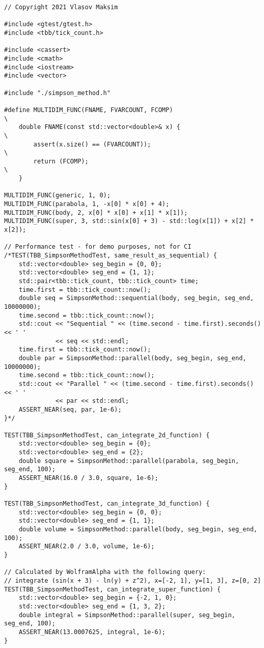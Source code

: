 \documentclass{report}
\begin{document}
\begin{lstlisting}
// Copyright 2021 Vlasov Maksim

#include <gtest/gtest.h>
#include <tbb/tick_count.h>

#include <cassert>
#include <cmath>
#include <iostream>
#include <vector>

#include "./simpson_method.h"

#define MULTIDIM_FUNC(FNAME, FVARCOUNT, FCOMP)                                 \
    double FNAME(const std::vector<double>& x) {                               \
        assert(x.size() == (FVARCOUNT));                                       \
        return (FCOMP);                                                        \
    }

MULTIDIM_FUNC(generic, 1, 0);
MULTIDIM_FUNC(parabola, 1, -x[0] * x[0] + 4);
MULTIDIM_FUNC(body, 2, x[0] * x[0] + x[1] * x[1]);
MULTIDIM_FUNC(super, 3, std::sin(x[0] + 3) - std::log(x[1]) + x[2] * x[2]);

// Performance test - for demo purposes, not for CI
/*TEST(TBB_SimpsonMethodTest, same_result_as_sequential) {
    std::vector<double> seg_begin = {0, 0};
    std::vector<double> seg_end = {1, 1};
    std::pair<tbb::tick_count, tbb::tick_count> time;
    time.first = tbb::tick_count::now();
    double seq = SimpsonMethod::sequential(body, seg_begin, seg_end, 10000000);
    time.second = tbb::tick_count::now();
    std::cout << "Sequential " << (time.second - time.first).seconds() << ' '
              << seq << std::endl;
    time.first = tbb::tick_count::now();
    double par = SimpsonMethod::parallel(body, seg_begin, seg_end, 10000000);
    time.second = tbb::tick_count::now();
    std::cout << "Parallel " << (time.second - time.first).seconds() << ' '
              << par << std::endl;
    ASSERT_NEAR(seq, par, 1e-6);
}*/

TEST(TBB_SimpsonMethodTest, can_integrate_2d_function) {
    std::vector<double> seg_begin = {0};
    std::vector<double> seg_end = {2};
    double square = SimpsonMethod::parallel(parabola, seg_begin, seg_end, 100);
    ASSERT_NEAR(16.0 / 3.0, square, 1e-6);
}

TEST(TBB_SimpsonMethodTest, can_integrate_3d_function) {
    std::vector<double> seg_begin = {0, 0};
    std::vector<double> seg_end = {1, 1};
    double volume = SimpsonMethod::parallel(body, seg_begin, seg_end, 100);
    ASSERT_NEAR(2.0 / 3.0, volume, 1e-6);
}

// Calculated by WolframAlpha with the following query:
// integrate (sin(x + 3) - ln(y) + z^2), x=[-2, 1], y=[1, 3], z=[0, 2]
TEST(TBB_SimpsonMethodTest, can_integrate_super_function) {
    std::vector<double> seg_begin = {-2, 1, 0};
    std::vector<double> seg_end = {1, 3, 2};
    double integral = SimpsonMethod::parallel(super, seg_begin, seg_end, 100);
    ASSERT_NEAR(13.0007625, integral, 1e-6);
}


\end{lstlisting}
\end{document}
